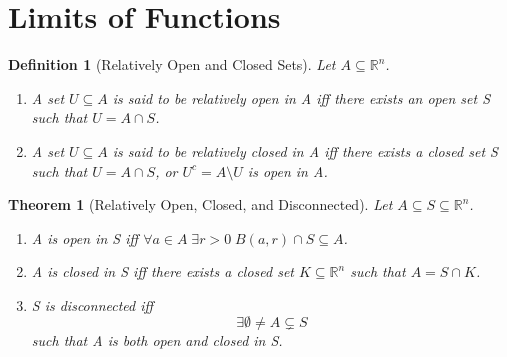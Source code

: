 \documentclass[11pt, oneside]{book}
\theoremstyle{break}
\newtheorem{thm}{Theorem}[section]
\newtheorem{defn}{Definition}[section]
\newcommand{\bb}[1]{\mathbb{#1}}			%
\begin{document}
\section{Limits of Functions}

\begin{defn}[Relatively Open and Closed Sets]
	Let $A \subseteq \bb{R}^n$.
	\begin{enumerate}
		\item A set $U \subseteq A$ is said to be relatively open in A iff there exists an open set S such that $U = A \cap S$.
		\item A set $U \subseteq A$ is said to be relatively closed in A iff there exists a closed set S such that $U = A \cap S$, or $U^c = A \setminus U$ is open in A.
	\end{enumerate}
\end{defn}

\begin{thm}[Relatively Open, Closed, and Disconnected]
	Let $A \subseteq S \subseteq \bb{R}^n$.
	\begin{enumerate}
		\item A is open in S iff $\forall a \in A \; \exists r > 0 \; B(a, r) \cap S \subseteq A$.
		\item A is closed in S iff there exists a closed set $K \subseteq \bb{R}^n$ such that $A = S \cap K$.
		\item S is disconnected iff
			\begin{equation*}
				\exists \emptyset \neq A \subsetneq S
			\end{equation*}
			such that A is both open and closed in S.
	\end{enumerate}
\end{thm}
\end{document}
